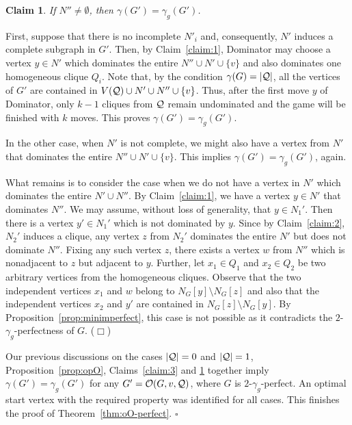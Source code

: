 \documentclass[12pt]{article}
\newtheorem{claim}{Claim}
\newcommand{\proof}{\noindent{\bf Proof.\ }}
\newcommand{\qed}{\hfill $\square$ \bigskip}
\newcommand{\cO}{{\cal O}}
\newcommand{\cQ}{{\cal Q}}
\newcommand{\smallqed}{{\tiny ($\Box$)}}
\begin{document}
\medskip

\begin{claim}
	\label{claim:4}
	If $N''\neq\emptyset$, then $\gamma(G')=\gamma_g(G')$. 
\end{claim}
\proof 
First, suppose that there is no incomplete $N'_i$ and, consequently, $N'$ induces a complete subgraph in $G'$. Then, by Claim~\ref{claim:1}, Dominator may choose a  vertex $y \in N'$ which dominates the entire $N'' \cup N'\cup\{v\}$ and also dominates one homogeneous clique $Q_i$. Note that, by the condition $\gamma(G)=|\cQ|$, all the vertices of $G'$ are contained in $V(\cQ)\cup N' \cup N'' \cup \{v\}$. Thus, after the first move $y$ of Dominator, only $k-1$ cliques from $\cQ$ remain undominated and the game will be finished with $k$ moves. This proves $\gamma(G')=\gamma_g(G')$.

In the other case, when $N'$ is not complete, we might also have a vertex from $ N'$ that dominates the entire $N'' \cup N'\cup\{v\}$. This implies $\gamma(G')=\gamma_g(G')$, again.

What remains is to consider the case when we do not have a vertex in $N'$ which dominates the entire $N' \cup N''$. By Claim~\ref{claim:1}, we have a vertex $y \in N'$ that dominates $N''$. We may assume, without loss of generality, that $y\in N_1'$. Then there is a vertex $y'\in N_1'$ which is not dominated by $y$. Since by Claim~\ref{claim:2}, $N_2'$ induces a clique, any vertex $z$ from $N_2'$ dominates the entire $N'$ but does not dominate $N''$. Fixing any such vertex $z$, there exists a vertex $w$ from $N''$ which is nonadjacent to $z$ but adjacent to $y$. Further, let $x_1 \in Q_1$ and  $x_2 \in Q_2$ be two arbitrary vertices from the homogeneous cliques. Observe that the two independent vertices $x_1$ and $w$  belong to $N_{G}[y]\setminus N_{G}[z]$  and also that the independent vertices $x_2$ and $y'$ are contained in $N_{G}[z]\setminus N_{G}[y]$. By Proposition~\ref{prop:minimperfect}, this case is not possible as it contradicts the $2$-$\gamma_g$-perfectness of $G$. \smallqed

\medskip

Our previous discussions on the cases $|\cQ|=0$ and $|\cQ|=1$, Proposition~\ref{prop:opO}, Claims~\ref{claim:3} and \ref{claim:4} together imply $\gamma(G')=\gamma_g(G')$ for any $G'= \cO(G,v,\cQ)$, where $G$ is $2$-$\gamma_g$-perfect. An optimal start vertex with the required property was identified for all cases. This finishes the proof of Theorem~\ref{thm:oO-perfect}. 
\qed
\end{document}
